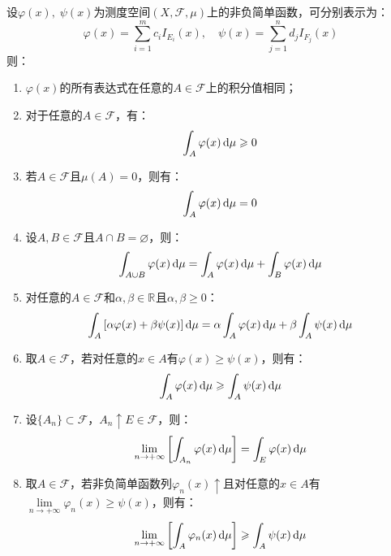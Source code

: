 \begin{property}\label{prop:NonnegativeSimpleIntegral}
	设$\varphi(x),\;\psi(x)$为测度空间$(X,\mathscr{F},\mu)$上的非负简单函数，可分别表示为：
	\begin{equation*}
		\varphi(x)=\sum_{i=1}^{m}c_iI_{E_i}(x),\quad
		\psi(x)=\sum_{j=1}^{n}d_jI_{F_j}(x)
	\end{equation*}
	则：
	\begin{enumerate}
		\item $\varphi(x)$的所有表达式在任意的$A\in \mathscr{F}$上的积分值相同；
		\item 对于任意的$A\in \mathscr{F}$，有：
		\begin{equation*}
			\int_{A}^{}\varphi(x)\mathop{}\!\mathrm{d} \mu\geqslant0
		\end{equation*}
		\item 若$A\in \mathscr{F}$且$\mu(A)=0$，则有：
		\begin{equation*}
			\int_{A}^{}\varphi(x)\mathop{}\!\mathrm{d}\mu=0
		\end{equation*}
		\item 设$A,B\in \mathscr{F}$且$A\cap B=\varnothing$，则：
		\begin{equation*}
			\int_{A\cup B}\varphi(x)\mathop{}\!\mathrm{d}\mu=\int_{A}\varphi(x)\mathop{}\!\mathrm{d}\mu+\int_{B}\varphi(x)\mathop{}\!\mathrm{d}\mu
		\end{equation*}
		\item 对任意的$A\in \mathscr{F}$和$\alpha,\beta\in \mathbb{R}^{}$且$\alpha,\beta\geqslant0$：
		\begin{equation*}
			\int_{A}\left[\alpha\varphi(x)+\beta\psi(x)\right]\mathop{}\!\mathrm{d}\mu
			=\alpha\int_{A}\varphi(x)\mathop{}\!\mathrm{d}\mu+\beta\int_{A}\psi(x)\mathop{}\!\mathrm{d}\mu
		\end{equation*}
		\item 取$A\in \mathscr{F}$，若对任意的$x\in A$有$\varphi(x)\geqslant \psi(x)$，则有：
		\begin{equation*}
			\int_{A}^{}\varphi(x)\mathop{}\!\mathrm{d}\mu\geqslant\int_{A}^{}\psi(x)\mathop{}\!\mathrm{d}\mu
		\end{equation*}
		\item 设$\{A_n\}\subset\mathscr{F}$，$A_n\uparrow E\in \mathscr{F}$，则：
		\begin{equation*}
			\lim_{n\to+\infty}\left[\int_{A_n}\varphi(x)\mathop{}\!\mathrm{d}\mu\right]=\int_{E}\varphi(x)\mathop{}\!\mathrm{d}\mu
		\end{equation*}
		\item 取$A\in \mathscr{F}$，若非负简单函数列$\varphi_n(x)\uparrow$且对任意的$x\in A$有$\lim\limits_{n\to+\infty}\varphi_n(x)\geqslant \psi(x)$，则有：
		\begin{equation*}
			\lim_{n\to+\infty}\left[\int_{A}^{}\varphi_n(x)\mathop{}\!\mathrm{d}\mu\right]\geqslant\int_{A}^{}\psi(x)\mathop{}\!\mathrm{d}\mu
		\end{equation*}
	\end{enumerate}
\end{property}
